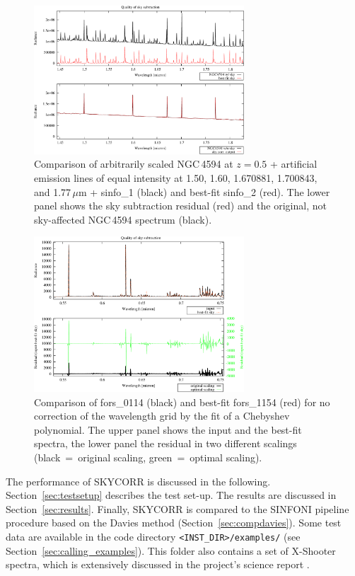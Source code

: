 \begin{figure}
\centering
\includegraphics[width=0.7\textwidth,clip=true]
{figures/N4594-SINFO-H_overplot_w_gal.pdf}
\caption[]{Comparison of arbitrarily scaled NGC\,4594 at $z = 0.5$ + artificial
emission lines of equal intensity at 1.50, 1.60, 1.670881, 1.700843, and
1.77\,$\mu$m + sinfo\_1 (black) and best-fit sinfo\_2 (red). The lower panel
shows the sky subtraction residual (red) and the original, not sky-affected
NGC\,4594 spectrum (black).}
\label{fig:sinfo_H_n4594}
\end{figure}

\begin{figure}
\centering
\includegraphics[width=0.7\textwidth,clip=true]{figures/TEST-FORS-4-NC_fit.pdf}
\caption[]{Comparison of fors\_0114 (black) and best-fit fors\_1154 (red) for
no correction of the wavelength grid by the fit of a Chebyshev polynomial. The
upper panel shows the input and the best-fit spectra, the lower panel the
residual in two different scalings (black~=~original scaling, green~=~optimal
scaling).}
\label{fig:fors_4_nc}
\end{figure}

The performance of SKYCORR is discussed in the following.
Section~\ref{sec:testsetup} describes the test set-up. The results are
discussed in Section~\ref{sec:results}. Finally, SKYCORR is compared to the
SINFONI pipeline procedure based on the Davies method
(Section~\ref{sec:compdavies}). Some test data are available in the code
directory {\tt <INST\_DIR>/examples/} (see
Section~\ref{sec:calling_examples}). This folder also contains a set of
X-Shooter spectra, which is extensively discussed in the project's science
report \cite{SM03SR}.

